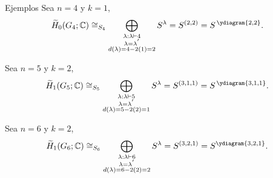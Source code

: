 \documentclass[final,xcolor=svgnames]{beamer}
\begin{document}
\begin{frame}{}
\begin{columns}
\begin{column}{0.5\textwidth}
\begin{block}{Ejemplos}
          Sea $n=4$ y $k=1$,
          \begin{equation*}
            \widetilde H_{0}(G_{4};\mathbb{C})\cong_{S_{4}}\bigoplus_{\substack{\lambda:\lambda\vdash 4\\
                \lambda=\lambda^{'}\\d(\lambda)=4-2(1)=2}} S^{\lambda}=S^{(2,2)}=S^{\,\ydiagram{2,2}}.
          \end{equation*}

          Sea $n=5$ y $k=2$,
          \begin{equation*}
            \widetilde H_{1}(G_{5};\mathbb{C})\cong_{S_{5}}\bigoplus_{\substack{\lambda:\lambda\vdash 5\\
                \lambda=\lambda^{'}\\d(\lambda)=5-2(2)=1}} S^{\lambda}=S^{(3,1,1)}=S^{\,\ydiagram{3,1,1}}.
          \end{equation*}
        
        Sea $n=6$ y $k=2$,
      \begin{equation*}
        \widetilde H_{1}(G_{6};\mathbb{C})\cong_{S_{6}}\bigoplus_{\substack{\lambda:\lambda\vdash 6\\
            \lambda=\lambda^{'}\\d(\lambda)=6-2(2)=2}} S^{\lambda}=S^{(3,2,1)}=S^{\ydiagram{3,2,1}}.
      \end{equation*}
    \end{block}
      

\end{column}
\end{columns}
\end{frame}
\end{document}
